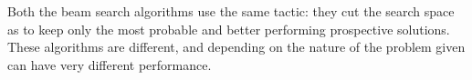\vspace{0.2 cm}
Both the beam search algorithms use the same tactic: they cut the search space as to keep only the most probable and better performing prospective solutions. These algorithms are different, and depending on the nature of the problem given can have very different performance.








